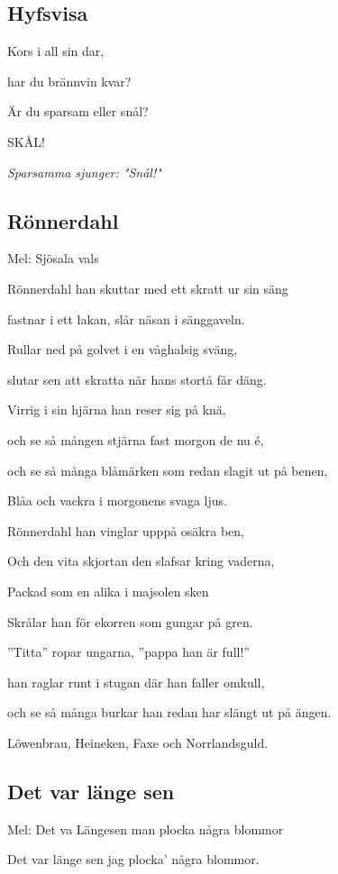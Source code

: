 \subsection{\textbf{Hyfsvisa}}

Kors i all sin dar,

har du brännvin kvar?

Är du sparsam eller snål?

SKÅL!

\emph{Sparsamma sjunger: "Snål!"}

\subsection{\textbf{Rönnerdahl}}

Mel: Sjösala vals\bigskip

Rönnerdahl han skuttar med ett skratt ur sin säng

fastnar i ett lakan, slår näsan i sänggaveln.

Rullar ned på golvet i en våghalsig sväng,

slutar sen att skratta när hans stortå får däng.

Virrig i sin hjärna han reser sig på knä,

och se så mången stjärna fast morgon de nu é,

och se så många blåmärken som redan slagit ut på benen,

Blåa och vackra i morgonens svaga ljus.\bigskip

Rönnerdahl han vinglar upppå osäkra ben,

Och den vita skjortan den slafsar kring vaderna,

Packad som en alika i majsolen sken

Skrålar han för ekorren som gungar på gren.

”Titta” ropar ungarna, ”pappa han är full!”

han raglar runt i stugan där han faller omkull,

och se så många burkar han redan har slängt ut på ängen.

Löwenbrau, Heineken, Faxe och Norrlandsguld.

\subsection{\textbf{Det var länge sen}}

Mel: Det va Längesen man plocka några blommor \bigskip

Det var länge sen jag plocka’ några blommor.

